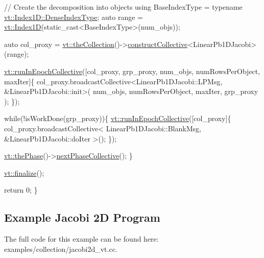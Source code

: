 \begin{DoxyCodeInclude}
  \textcolor{comment}{// Create the decomposition into objects}
  \textcolor{keyword}{using} BaseIndexType = \textcolor{keyword}{typename} \hyperlink{structvt_1_1index_1_1_dense_index_array_a36698427e28045290d1fb072573275ec}{vt::Index1D::DenseIndexType};
  \textcolor{keyword}{auto} range = \hyperlink{namespacevt_a5540efc78234273e1796fb003fe4d234}{vt::Index1D}(static\_cast<BaseIndexType>(num\_objs));

  \textcolor{keyword}{auto} col\_proxy =
    \hyperlink{namespacevt_a1c45ce63bfd2c327ff7d76a319a371d8}{vt::theCollection}()->\hyperlink{structvt_1_1vrt_1_1collection_1_1_collection_manager_aa2531212565b2c6f85fa3b55d278bbba}{constructCollective}<LinearPb1DJacobi>(range);

  \hyperlink{namespacevt_a2fc4ef34f30b49a1781d765804bfadbb}{vt::runInEpochCollective}([col\_proxy, grp\_proxy, num\_objs, numRowsPerObject, 
      maxIter]\{
    col\_proxy.broadcastCollective<LinearPb1DJacobi::LPMsg, &LinearPb1DJacobi::init>(
      num\_objs, numRowsPerObject, maxIter, grp\_proxy
    );
  \});

  \textcolor{keywordflow}{while}(!isWorkDone(grp\_proxy))\{
    \hyperlink{namespacevt_a2fc4ef34f30b49a1781d765804bfadbb}{vt::runInEpochCollective}([col\_proxy]\{
      col\_proxy.broadcastCollective<
        LinearPb1DJacobi::BlankMsg, &LinearPb1DJacobi::doIter
      >();
    \});

    \hyperlink{namespacevt_a3799d6b51fb71d7b6505760aad457e61}{vt::thePhase}()->\hyperlink{structvt_1_1phase_1_1_phase_manager_ac94bfde4a103cbdec426542191c41092}{nextPhaseCollective}();
  \}

  \hyperlink{namespacevt_a540d90dbd6e97b69f1dcbc9ee9314cff}{vt::finalize}();

  \textcolor{keywordflow}{return} 0;
\}

\end{DoxyCodeInclude}
\hypertarget{jacobi2d-example}{}\subsection{Example Jacobi 2D Program}\label{jacobi2d-example}
The full code for this example can be found here\+: {\ttfamily examples/collection/jacobi2d\+\_\+vt.\+cc}.


